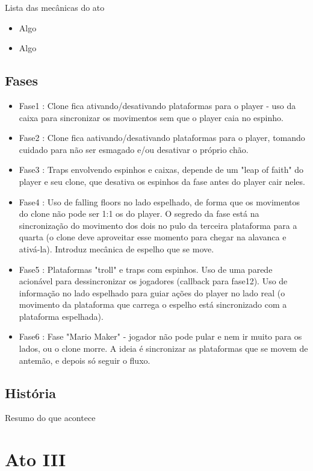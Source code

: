 \documentclass[a4paper, 11pt]{article}
\begin{document}
\begin{itemize}
	Lista das mecânicas do ato 
	\begin{itemize} 
		\item Algo 
		\item Algo 
	\end{itemize} 
 
\subsection{Fases} 
 
	\begin{itemize} 
		\item Fase1 : Clone fica ativando/desativando plataformas para o player - uso da caixa para sincronizar os movimentos sem que o player caia no espinho.
		\item Fase2 : Clone fica aativando/desativando plataformas para o player, tomando cuidado para não ser esmagado e/ou desativar o próprio chão.
		\item Fase3 : Traps envolvendo espinhos e caixas, depende de um "leap of faith" do player e seu clone, que desativa os espinhos da fase antes do player cair neles.
		\item Fase4 : Uso de falling floors no lado espelhado, de forma que os movimentos do clone não pode ser 1:1 os do player. O segredo da fase está na sincronização do movimento dos dois no pulo da terceira plataforma para a quarta (o clone deve aproveitar esse momento para chegar na alavanca e ativá-la). Introduz mecânica de espelho que se move.
		\item Fase5 : Plataformas "troll" e traps com espinhos. Uso de uma parede acionável para dessincronizar os jogadores (callback para fase12). Uso de informação no lado espelhado para guiar ações do player no lado real (o movimento da plataforma que carrega o espelho está sincronizado com a plataforma espelhada).
		\item Fase6 : Fase "Mario Maker" - jogador não pode pular e nem ir muito para os lados, ou o clone morre. A ideia é sincronizar as plataformas que se movem de antemão, e depois só seguir o fluxo.
	\end{itemize} 
 
 
\subsection{História} 
 
	Resumo do que acontece 
 
\section{Ato III} 
 

\end{itemize}
\end{document}
